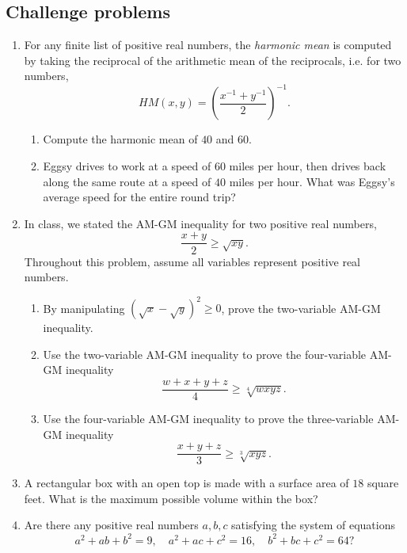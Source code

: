 \subsection{Challenge problems}

\begin{enumerate}[resume]
\item For any finite list of positive real numbers, the \emph{harmonic mean} is computed by taking the reciprocal of the arithmetic mean of the reciprocals, i.e. for two numbers,
\begin{equation*}
HM(x,y) = \left(\frac{x^{-1} + y^{-1}}{2}\right)^{-1}.
\end{equation*}
\begin{enumerate}
\item Compute the harmonic mean of $40$ and $60$.
\item Eggsy drives to work at a speed of $60$ miles per hour, then drives back along the same route at a speed of $40$ miles per hour. What was Eggsy's average speed for the entire round trip?
\end{enumerate}
\item In class, we stated the AM-GM inequality for two positive real numbers,
\begin{equation*}
\frac{x + y}{2}\geq\sqrt{xy}.
\end{equation*}
Throughout this problem, assume all variables represent positive real numbers.
\begin{enumerate}
\item By manipulating $\left(\sqrt{x} - \sqrt{y}\right)^2\geq 0$, prove the two-variable AM-GM inequality.
\item Use the two-variable AM-GM inequality to prove the four-variable AM-GM inequality
\begin{equation*}
\frac{w + x + y + z}{4}\geq\sqrt[4]{wxyz}.
\end{equation*}
\item Use the four-variable AM-GM inequality to prove the three-variable AM-GM inequality
\begin{equation*}
\frac{x + y + z}{3}\geq\sqrt[3]{xyz}.
\end{equation*}
\end{enumerate}
\item A rectangular box with an open top is made with a surface area of $18$ square feet. What is the maximum possible volume within the box?
\item Are there any positive real numbers $a,b,c$ satisfying the system of equations
\begin{equation*}
a^2 + ab + b^2 = 9,\quad a^2 + ac + c^2 = 16,\quad b^2 + bc + c^2 = 64?
\end{equation*}
\end{enumerate}


